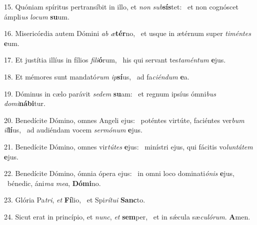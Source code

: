 15. Quóniam spíritus pertransíbit in illo, et \textit{non} \textit{sub}\textbf{sís}tet: \ast\  et non cognóscet ámpli\textit{us} \textit{lo}\textit{cum} \textbf{su}um.\

16. Misericórdia autem Dómini \textit{ab} \textit{æ}\textbf{tér}no, \ast\  et usque in ætérnum super \textit{ti}\textit{mén}\textit{tes} \textbf{e}um.\

17. Et justítia illíus in fílios \textit{fi}\textit{li}\textbf{ó}rum, \ast\  his qui servant tes\textit{ta}\textit{mén}\textit{tum} \textbf{e}jus.\

18. Et mémores sunt mandató\textit{rum} \textit{ip}\textbf{sí}us, \ast\  ad fa\textit{ci}\textit{én}\textit{dum} \textbf{e}a.\

19. Dóminus in cælo parávit \textit{se}\textit{dem} \textbf{su}am: \ast\  et regnum ipsíus ómni\textit{bus} \textit{do}\textit{mi}\textbf{ná}\textbf{bi}tur.\

20. Benedícite Dómino, omnes Angeli ejus: \dag\  poténtes virtúte, faciéntes ver\textit{bum} \textit{il}\textbf{lí}us, \ast\  ad audiéndam vocem \textit{ser}\textit{mó}\textit{num} \textbf{e}jus.\

21. Benedícite Dómino, omnes vir\textit{tú}\textit{tes} \textbf{e}jus: \ast\  minístri ejus, qui fácitis vo\textit{lun}\textit{tá}\textit{tem} \textbf{e}jus.\

22. Benedícite Dómino, ómnia ópera ejus: \dag\  in omni loco dominati\textit{ó}\textit{nis} \textbf{e}jus, \ast\  bénedic, áni\textit{ma} \textit{me}\textit{a}, \textbf{Dó}\textbf{mi}no.\

23. Glória Pa\textit{tri}, \textit{et} \textbf{Fí}lio, \ast\  et Spi\textit{rí}\textit{tu}\textit{i} \textbf{Sanc}to.\

24. Sicut erat in princípio, et \textit{nunc}, \textit{et} \textbf{sem}per, \ast\  et in sǽcula sæ\textit{cu}\textit{ló}\textit{rum}. \textbf{A}men.\

